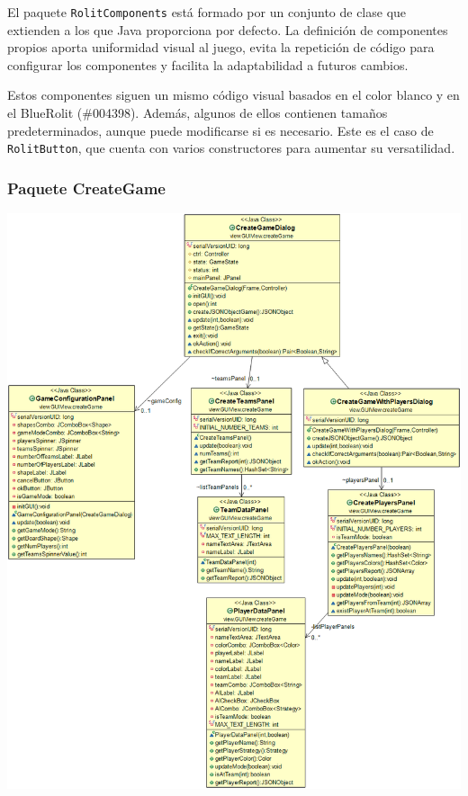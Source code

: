 \documentclass[../DocumentoOficial.tex]{subfiles}
\begin{document}
El paquete \texttt{RolitComponents} está formado por un conjunto de clase que extienden a los que Java proporciona por defecto. La definición de componentes propios aporta uniformidad visual al juego, evita la repetición de código para configurar los componentes y facilita la adaptabilidad a futuros cambios.

Estos componentes siguen un mismo código visual basados en el color blanco y en el BlueRolit (\#004398). Además, algunos de ellos contienen tamaños predeterminados, aunque puede modificarse si es necesario. Este es el caso de \texttt{RolitButton}, que cuenta con varios constructores para aumentar su versatilidad.

\newpage
\subsubsection{Paquete CreateGame}
\begin{center}
\includegraphics[scale=0.38]{CreateGamePaq.png} 
\end{center}
\end{document}

